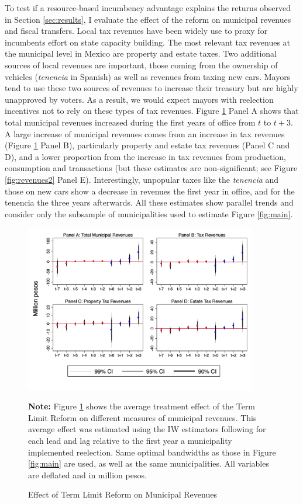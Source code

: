 \documentclass[12pt]{amsart}
\numberwithin{equation}{section}
\theoremstyle{definition}
\theoremstyle{definition}
\theoremstyle{definition}
\begin{document}
To test if a resource-based incumbency advantage explains the returns observed in Section \ref{sec:results}, I evaluate the effect of the reform on municipal revenues and fiscal transfers. Local tax revenues have been widely use to proxy for incumbents effort on state capacity building. The most relevant tax revenues at the municipal level in Mexico are property and estate taxes. Two additional sources of local revenues are important, those coming from the ownership of vehicles (\emph{tenencia} in Spanish) as well as revenues from taxing new cars. Mayors tend to use these two sources of revenues to increase their treasury but are highly unapproved by voters. As a result, we would expect mayors with reelection incentives not to rely on these types of tax revenues. Figure \ref{fig:revenues1} Panel A shows that total municipal revenues increased during the first years of office from $t$ to $t+3$. A large increase of municipal revenues comes from an increase in tax revenues (Figure \ref{fig:revenues1} Panel B), particularly property and estate tax revenues (Panel C and D), and a lower proportion from the increase in tax revenues from production, consumption and transactions (but these estimates are non-significant; see Figure \ref{fig:revenues2} Panel E). Interestingly, unpopular taxes like the \emph{tenencia} and those on new cars show a decrease in revenues the first year in office, and for the tenencia the three years afterwards. All these estimates show parallel trends and consider only the subsample of municipalities used to estimate Figure \ref{fig:main}. 
  
  
\begin{figure}[h]   
\centering
 \caption{Effect of Term Limit Reform on Municipal Revenues}
 \label{fig:revenues1}
\includegraphics[width=0.9\textwidth]{Figures_incumbency/revenues_allyears1.png}
       \captionsetup{justification=centering}
         
 \textbf{Note:}  Figure \ref{fig:revenues1} shows the average treatment effect of the Term Limit Reform on different measures of municipal revenues. This average effect was estimated using the IW estimators following \citet{abraham_sun_2020} for each lead and lag relative to the first year a municipality implemented reelection. Same optimal bandwidths as those in Figure \ref{fig:main} are used, as well as the same municipalities. All variables are deflated and in million pesos. 
\end{figure}   
\end{document}
